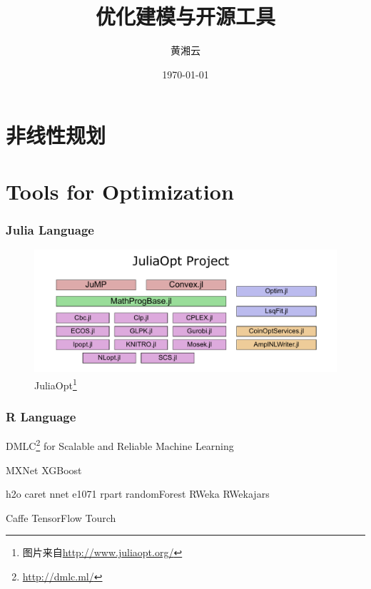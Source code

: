 \documentclass[10pt,UTF8]{beamer}\usepackage[]{graphicx}\usepackage[]{color}
\title{优化建模与开源工具}
\author{黄湘云}
\institute{Department of Statistics}
\date{\today}
\begin{document}
\frame{\titlepage}

\section{非线性规划}
























\section{Tools for Optimization}

\begin{frame}
\frametitle{Julia Language}
\begin{figure}[htbp]
  \centering
\includegraphics[width=\textwidth]{figure/JuliaOpt.pdf}
  \caption{JuliaOpt\footnote{图片来自\url{http://www.juliaopt.org/}}}\label{fig:JuliaOpt}
\end{figure}
\end{frame}

\begin{frame}
\frametitle{R Language}
{\color{blue}\textsf{DMLC}}\footnote{\url{http://dmlc.ml/}} for Scalable and Reliable Machine Learning 

MXNet
XGBoost

h2o
caret
nnet
e1071
rpart
randomForest
RWeka RWekajars

Caffe
TensorFlow
Tourch
\end{frame}
\end{document}

